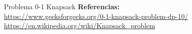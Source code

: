Problema 0-1 Knapsack 
\textbf{Referencias:} \\
\url{https://www.geeksforgeeks.org/0-1-knapsack-problem-dp-10/} \\
\url{https://en.wikipedia.org/wiki/Knapsack_problem}